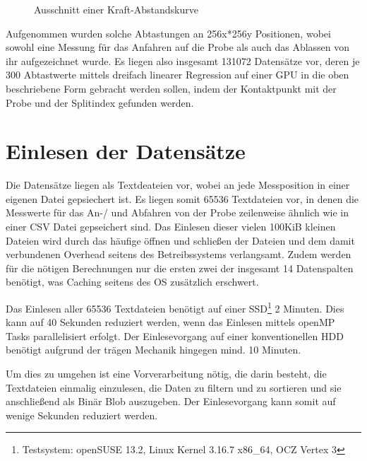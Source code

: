 \begin{figure}[h!]
\centering
\caption{Ausschnitt einer Kraft-Abstandskurve}
\label{fig:kraftbsp}
\end{figure}

Aufgenommen wurden solche Abtastungen an 256x*256y Positionen, wobei sowohl eine Messung für das Anfahren auf die Probe als auch das Ablassen von ihr aufgezeichnet wurde. Es liegen also insgesamt 131072 Datensätze vor, deren je 300 Abtastwerte mittels dreifach linearer Regression auf einer GPU in die oben beschriebene Form gebracht werden sollen, indem der Kontaktpunkt mit der Probe und der Splitindex gefunden werden.

\pagebreak
\section{Einlesen der Datensätze}
\label{einlesen}
Die Datensätze liegen als Textdeateien vor, wobei an jede Messposition in einer eigenen Datei gepsiechert ist. Es liegen somit 65536 Textdateien vor, in denen die Messwerte für das An-/ und Abfahren von der Probe zeilenweise ähnlich wie in einer CSV Datei gepseichert sind.
Das Einlesen dieser vielen 100KiB kleinen Dateien wird durch das häufige öffnen und schließen der Dateien und dem damit verbundenen Overhead seitens des Betreibssystems verlangsamt. Zudem werden für die nötigen Berechnungen nur die ersten zwei der insgesamt 14 Datenspalten benötigt, was Caching seitens des OS zusätzlich erschwert.


Das Einlesen aller 65536 Textdateien benötigt auf einer SSD\footnote{Testsystem: openSUSE 13.2, Linux Kernel 3.16.7 x86\_64, OCZ Vertex 3} 2 Minuten. Dies kann auf 40 Sekunden reduziert werden, wenn das Einlesen mittels openMP Tasks parallelisiert erfolgt.
Der Einlesevorgang auf einer konventionellen HDD benötigt aufgrund der trägen Mechanik hingegen mind. 10 Minuten.

Um dies zu umgehen ist eine Vorverarbeitung nötig, die darin besteht, die Textdateien einmalig einzulesen, die Daten zu filtern und zu sortieren und sie anschließend als Binär Blob auszugeben. Der Einlesevorgang kann somit auf wenige Sekunden reduziert werden.

